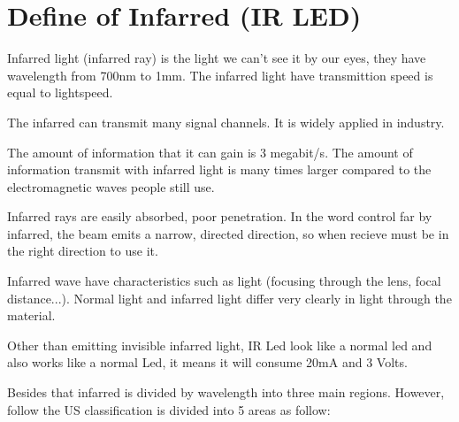 \documentclass[a4paper]{report}
\begin{document}
    \section{Define of Infarred (IR LED)}
        Infarred light (infarred ray) is the light we can't see it by our eyes, 
        they have wavelength from 700nm to 1mm. The infarred light have transmittion speed 
        is equal to lightspeed.
        \linebreak
        \par The infarred can transmit many signal channels. It is widely 
        applied in industry.
        \linebreak
        \par The amount of information that it can gain is 3 megabit/s. The 
        amount of information transmit with infarred light is many times larger 
        compared to the electromagnetic waves people still use.
        \linebreak
        \par Infarred rays are easily absorbed, poor penetration. In the word control 
        far by infarred, the beam emits a narrow, directed direction, so when recieve 
        must be in the right direction to use it.
        \linebreak
        \par Infarred wave have characteristics such as light (focusing through the lens, focal distance...). 
        Normal light and infarred light differ very clearly in light through the material.
        \linebreak
        \par Other than emitting invisible infarred light, IR Led look like a normal led and also
        works like a normal Led, it means it will consume 20mA and 3 Volts.
        \linebreak
        \par Besides that infarred is divided by wavelength into three main regions. However, follow the US classification is divided into 5 areas as follow: \\ 
        \vspace{3mm} 
\end{document}
